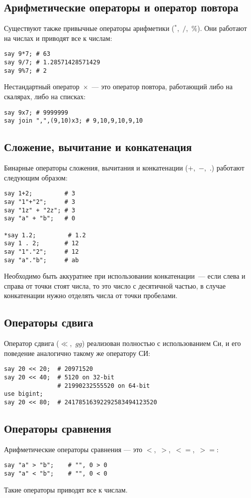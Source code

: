 \subsection{Арифметические операторы и оператор повтора}
Существуют также привычные операторы арифметики ($^{\ast}$,~$/$,~$\%$).
Они работают на числах и приводят все к числам:
\begin{verbatim}
say 9*7; # 63
say 9/7; # 1.28571428571429
say 9%7; # 2
\end{verbatim}

Нестандартный оператор~$\times$~--- это {оператор повтора}, работающий либо на скалярах, либо на списках:
\begin{verbatim}
say 9x7; # 9999999
say join ",",(9,10)x3; # 9,10,9,10,9,10
\end{verbatim}

\subsection{Сложение, вычитание и конкатенация}
Бинарные операторы сложения, вычитания и конкатенации ($+$,~$-$,~$.$) работают следующим образом:
\begin{verbatim}
say 1+2;         # 3
say "1"+"2";     # 3
say "1z" + "2z"; # 3
say "a" + "b";   # 0

*say 1.2;         # 1.2
say 1 . 2;       # 12
say "1"."2";     # 12
say "a"."b";     # ab
\end{verbatim}
Необходимо быть аккуратнее при использовании конкатенации~--- если слева и справа от точки стоят числа, то это число с десятичной частью, в случае конкатенации нужно отделять числа от точки пробелами.

\subsection{Операторы сдвига}
{Оператор сдвига} ($\ll$,~$gg$) реализован полностью с использованием Си, и его поведение аналогично такому же оператору СИ:
\begin{verbatim}
say 20 << 20;  # 20971520
say 20 << 40;  # 5120 on 32-bit
               # 21990232555520 on 64-bit
use bigint;
say 20 << 80;  # 24178516392292583494123520
\end{verbatim}


\subsection{Операторы сравнения}
Арифметические операторы сравнения --- это $<$,~$>$,~$<=$,~$>=$:
\begin{verbatim}
say "a" > "b";    # "", 0 > 0
say "a" < "b";    # "", 0 < 0
\end{verbatim}
Такие операторы приводят все к числам.

